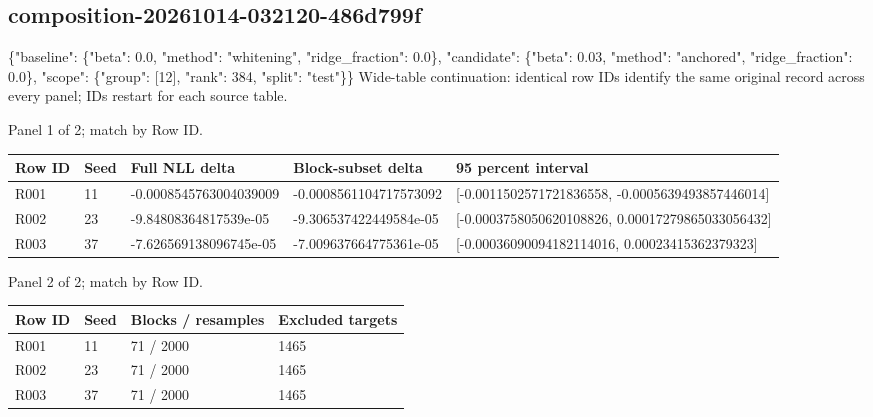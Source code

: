\documentclass[10pt]{article}
\begin{document}
\subsection{composition-20261014-032120-486d799f}
\{"baseline": \{"beta": 0.0, "method": "whitening", "ridge\_fraction": 0.0\}, "candidate": \{"beta": 0.03, "method": "anchored", "ridge\_fraction": 0.0\}, "scope": \{"group": [12], "rank": 384, "split": "test"\}\}
Wide-table continuation: identical row IDs identify the same original record across every panel; IDs restart for each source table.
\par\noindent Panel 1 of 2; match by Row ID.
{\scriptsize\setlength{\tabcolsep}{2pt}
\begin{longtable}{p{}p{}p{}p{}p{}}
Row ID & Seed & Full NLL delta & Block-subset delta & 95 percent interval \\
\hline\endhead
R001 & 11 & -0.0008545763004039009 & -0.0008561104717573092 & [-0.0011502571721836558, -0.0005639493857446014] \\
R002 & 23 & -9.84808364817539e-05 & -9.306537422449584e-05 & [-0.0003758050620108826, 0.00017279865033056432] \\
R003 & 37 & -7.626569138096745e-05 & -7.009637664775361e-05 & [-0.00036090094182114016, 0.00023415362379323] \\
\end{longtable}}
\par\noindent Panel 2 of 2; match by Row ID.
{\scriptsize\setlength{\tabcolsep}{2pt}
\begin{longtable}{p{}p{}p{}p{}}
Row ID & Seed & Blocks / resamples & Excluded targets \\
\hline\endhead
R001 & 11 & 71 / 2000 & 1465 \\
R002 & 23 & 71 / 2000 & 1465 \\
R003 & 37 & 71 / 2000 & 1465 \\
\end{longtable}}
\end{document}
